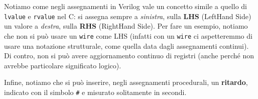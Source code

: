 \documentclass[a4paper,11pt]{article}
\begin{document}
Notiamo come negli assegnamenti in Verilog vale un concetto simile a quello di \lstinline|lvalue| e \lstinline|rvalue| nel C: si assegna sempre a \textit{sinistra}, sulla \textbf{LHS} (LeftHand Side) un valore a \textit{destra}, sulla \textbf{RHS} (RightHand Side).
Per fare un esempio, notiamo che non si può usare un \lstinline|wire| come LHS (infatti con un \lstinline|wire| ci aspetteremmo di usare una notazione strutturale, come quella data dagli assegnamenti continui).
Di contro, non si può avere aggiornamento continuo di registri (anche perché non avrebbe particolare significato logico).

Infine, notiamo che si può inserire, negli assegnamenti procedurali, un \textbf{ritardo}, indicato con il simbolo \lstinline|#| e misurato solitamente in secondi.
\end{document}
